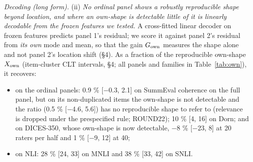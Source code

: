 \documentclass[10pt,twocolumn]{article}
\providecommand{\tightlist}{\setlength{\itemsep}{0pt}\setlength{\parskip}{0pt}}
\begin{document}
\emph{Decoding (long form).} (ii) \emph{No ordinal panel shows a robustly reproducible shape beyond location, and where an own-shape is detectable little of it is linearly decodable from the frozen features we tested.} A cross-fitted linear decoder on frozen features predicts panel 1's residual; we score it against panel 2's residual from \emph{its own} mode and mean, so that the gain \(G_{\rm own}\) measures the shape alone and not panel 2's location shift (\S{}4). As a fraction of the reproducible own-shape \(X_{\rm own}\) (item-cluster CLT intervals, \S{}4; all panels and families in Table~\ref{tab:own}), it recovers:

\begin{itemize}
\tightlist
\item
  on the ordinal panels: 0.9 \% {[}$-$0.3, 2.1{]} on SummEval coherence on the full panel, but on its non-duplicated items the own-shape is not detectable and the ratio (0.5 \% {[}$-$4.6, 5.6{]}) has no reproducible shape to refer to (relevance is dropped under the prespecified rule; ROUND22); 10 \% {[}4, 16{]} on Dorn; and on DICES-350, whose own-shape is now detectable, $-$8 \% {[}$-$23, 8{]} at 20 raters per half and 1 \% {[}$-$9, 12{]} at 40;
\item
  on NLI: 28 \% {[}24, 33{]} on MNLI and 38 \% {[}33, 42{]} on SNLI.
\end{itemize}
\end{document}
